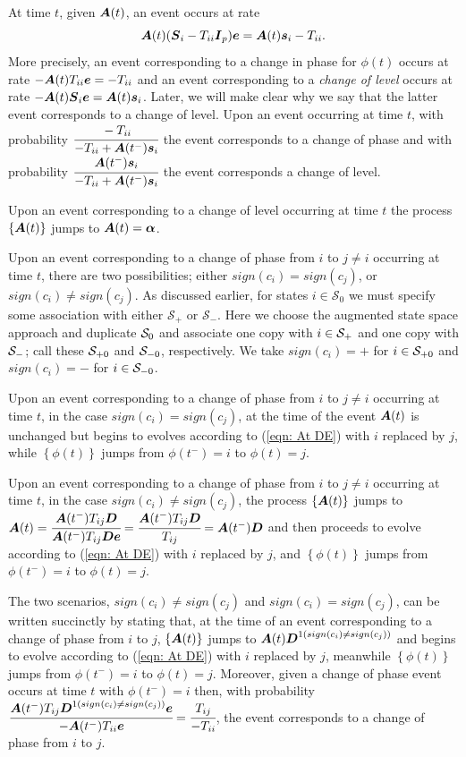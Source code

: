 At time \(t\), given \(\boldsymbol A(t)\), an event occurs at rate 
\[\boldsymbol A(t) (\boldsymbol{S}_i - T_{ii}\boldsymbol{I}_p)\boldsymbol e = \boldsymbol A(t)\boldsymbol s_i - T_{ii}.\]
More precisely, an event corresponding to a change in phase for \({\phi}(t)\) occurs at rate \(-\boldsymbol A(t) T_{ii}\boldsymbol e = -T_{ii}\) and an event corresponding to a \emph{change of level} occurs at rate \(-\boldsymbol A(t) \boldsymbol{S}_i\boldsymbol e = \boldsymbol A(t) \boldsymbol s_i\). Later, we will make clear why we say that the latter event corresponds to a change of level. Upon an event occurring at time \(t\), with probability \(\cfrac{-T_{ii}}{-T_{ii} + \boldsymbol A({t^-})\boldsymbol s_i}\) the event corresponds to a change of phase and with probability \(\cfrac{\boldsymbol A({t^-})\boldsymbol s_i}{-T_{ii} + \boldsymbol A({t^-})\boldsymbol s_i}\) the event corresponds a change of level. 

Upon an event corresponding to a change of level occurring at time \(t\) the process \(\{\boldsymbol A(t)\}\) jumps to
\(\boldsymbol A(t) = \boldsymbol \alpha\). 

Upon an event corresponding to a change of phase from \(i\) to \(j\neq i\) occurring at time \(t\), there are two possibilities; either \(sign(c_i)=sign(c_j)\), or \(sign(c_i)\neq sign(c_j)\). As discussed earlier, for states \(i\in\mathcal S_0\) we must specify some association with either \(\mathcal S_+\) or \(\mathcal S_-\). Here we choose the augmented state space approach and duplicate \(\mathcal{S}_0\) and associate one copy with \(i\in\mathcal{S}_+\) and one copy with \(\mathcal{S}_-\); call these \(\mathcal{S}_{+0}\) and \(\mathcal{S}_{-0}\), respectively. We take \(sign(c_i)=+\) for \(i\in\mathcal{S}_{+0}\) and \(sign(c_i)=-\) for \(i\in\mathcal{S}_{-0}\).

Upon an event corresponding to a change of phase from \(i\) to \(j\neq i\) occurring at time \(t\), in the case \(sign(c_i)=sign(c_j)\), at the time of the event \(\boldsymbol A(t)\) is unchanged but begins to evolves according to (\ref{eqn: At DE}) with \(i\) replaced by \(j\), while \(\left\{{\phi}(t)\right\}\) jumps from \({\phi}(t^-)=i\) to \({\phi}(t)=j\). 

Upon an event corresponding to a change of phase from \(i\) to \(j\neq i\) occurring at time \(t\), in the case \(sign(c_i)\neq sign(c_j)\), the process \(\{\boldsymbol A(t)\}\) jumps to \(\boldsymbol A(t) = \cfrac{\boldsymbol A({t^-}) T_{ij}\boldsymbol{D}}{\boldsymbol A({t^-}) T_{ij} \boldsymbol{D} \boldsymbol e} = \cfrac{\boldsymbol A({t^-}) T_{ij}\boldsymbol{D}}{T_{ij} } = \boldsymbol A({t^-}) \boldsymbol{D} \) and then proceeds to evolve according to (\ref{eqn: At DE}) with \(i\) replaced by \(j\), and \(\left\{{\phi}(t)\right\}\) jumps from \({\phi}(t^-)=i\) to \({\phi}(t)=j\). 

The two scenarios, \(sign(c_i)\neq sign(c_j)\) and \(sign(c_i)= sign(c_j)\), can be written succinctly by stating that, at the time of an event corresponding to a change of phase from \(i\) to \(j\), \(\{\boldsymbol A(t)\}\) jumps to \(\boldsymbol A(t)\boldsymbol{D}^{1(sign(c_i)\neq sign(c_j))}\) and begins to evolve according to (\ref{eqn: At DE}) with \(i\) replaced by \(j\), meanwhile \(\left\{{\phi}(t)\right\}\) jumps from \(\phi(t^-)=i\) to \(\phi(t)=j\). Moreover, given a change of phase event occurs at time \(t\) with \(\phi(t^-)=i\) then, with probability \(\cfrac{\boldsymbol A(t^-)T_{ij}\boldsymbol{D}^{1(sign(c_i)\neq sign(c_j))}\boldsymbol e}{-\boldsymbol A(t^{-})T_{ii}\boldsymbol e} = \cfrac{T_{ij}}{-T_{ii}}\), the event corresponds to a change of phase from \(i\) to \(j\). 

